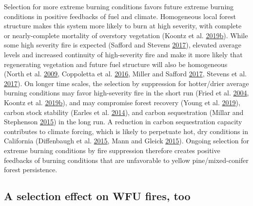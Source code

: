 \documentclass[twoside,12pt,final]{ucthesis-CA2012}
\begin{document}
\begin{ucmainmatter}
Selection for more extreme burning conditions favors future extreme
burning conditions in positive feedbacks of fuel and climate.
Homogeneous local forest structure makes this system more likely to burn
at high severity, with complete or nearly-complete mortality of
overstory vegetation (Koontz et al.
\protect\hyperlink{ref-koontz2019a}{2019}\protect\hyperlink{ref-koontz2019a}{b}).
While some high severity fire is expected (Safford and Stevens
\protect\hyperlink{ref-safford2017}{2017}), elevated average levels and
increased continuity of high-severity fire and make it more likely that
regenerating vegetation and future fuel structure will also be
homogeneous (North et al. \protect\hyperlink{ref-north2009a}{2009},
Coppoletta et al. \protect\hyperlink{ref-coppoletta2016}{2016}, Miller
and Safford \protect\hyperlink{ref-miller2017}{2017}, Stevens et al.
\protect\hyperlink{ref-stevens2017}{2017}). On longer time scales, the
selection by suppression for hotter/drier average burning conditions may
favor high-severity fire in the short run (Fried et al.
\protect\hyperlink{ref-fried2004}{2004}, Koontz et al.
\protect\hyperlink{ref-koontz2019a}{2019}\protect\hyperlink{ref-koontz2019a}{b}),
and may compromise forest recovery (Young et al.
\protect\hyperlink{ref-young2019}{2019}), carbon stock stability (Earles
et al. \protect\hyperlink{ref-earles2014}{2014}), and carbon
sequestration (Millar and Stephenson
\protect\hyperlink{ref-millar2015}{2015}) in the long run. A reduction
in carbon sequestration capacity contributes to climate forcing, which
is likely to perpetuate hot, dry conditions in California (Diffenbaugh
et al. \protect\hyperlink{ref-diffenbaugh2015}{2015}, Mann and Gleick
\protect\hyperlink{ref-mann2015}{2015}). Ongoing selection for extreme
burning conditions by fire suppression therefore creates positive
feedbacks of burning conditions that are unfavorable to yellow
pine/mixed-conifer forest persistence.

\subsection{A selection effect on WFU fires,
too}\label{a-selection-effect-on-wfu-fires-too}


\end{ucmainmatter}
\end{document}
